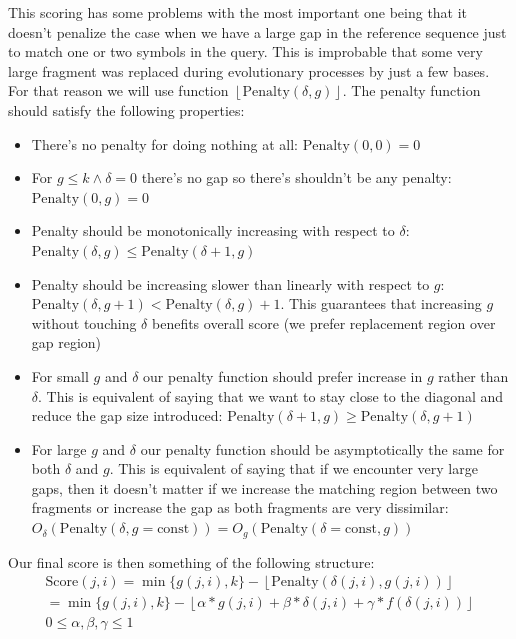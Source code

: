 This scoring has some problems with the most important one being that it doesn't penalize the case when we have a large gap in the reference sequence just to match one or two symbols in the query. This is improbable that some very large fragment was replaced during evolutionary processes by just a few bases.
For that reason we will use function $\left\lfloor\text{Penalty}(\delta, g)\right\rfloor$. The penalty function should satisfy the following properties:
\begin{itemize}
  \item There's no penalty for doing nothing at all: $\text{Penalty}(0, 0) = 0$
  \item For $g \leq k \land \delta = 0$ there's no gap so there's shouldn't be any penalty: $\text{Penalty}(0, g) = 0$
  \item Penalty should be monotonically increasing with respect to $\delta$: $\text{Penalty}(\delta, g) \leq \text{Penalty}(\delta+1, g)$
  \item Penalty should be increasing slower than linearly with respect to $g$: $\text{Penalty}(\delta, g+1) < \text{Penalty}(\delta, g) + 1$. This guarantees that increasing $g$ without touching $\delta$ benefits overall score (we prefer replacement region over gap region)
  \item For small $g$ and $\delta$ our penalty function should prefer increase in $g$ rather than $\delta$. This is equivalent of saying that we want to stay close to the diagonal and reduce the gap size introduced: $\text{Penalty}(\delta+1, g) \geq \text{Penalty}(\delta, g+1)$
  \item For large $g$ and $\delta$ our penalty function should be asymptotically the same for both $\delta$ and $g$. This is equivalent of saying that if we encounter very large gaps, then it doesn't matter if we increase the matching region between two fragments or increase the gap as both fragments are very dissimilar: $O_{\delta}(\text{Penalty}(\delta, g = \text{const})) = O_{g}(\text{Penalty}(\delta = \text{const}, g))$
\end{itemize}


Our final score is then something of the following structure:
\begin{equation}
\begin{gathered}
\text{Score}(j,i) = \min\{g(j,i), k\} - \left\lfloor\text{Penalty}(\delta(j,i), g(j,i))\right\rfloor \\
= \min\{g(j,i), k\} - \left\lfloor \alpha * g(j,i) + \beta * \delta(j,i) + \gamma * f(\delta(j,i)) \right\rfloor \\
0 \leq \alpha, \beta, \gamma \leq 1
\end{gathered}
\end{equation}

